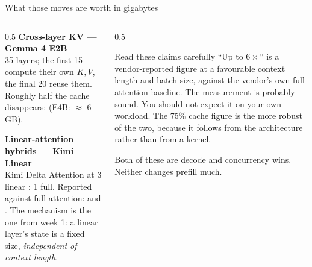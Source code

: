 \documentclass[aspectratio=169,10pt]{beamer}
\begin{document}
\begin{frame}{What those moves are worth in gigabytes}
  \begin{columns}[T]
    \begin{column}{0.5\textwidth}
      \textbf{Cross-layer KV --- Gemma 4 E2B}\\[0.3em]
      \small
      35 layers; the first 15 compute their own $K,V$, the final 20 reuse
      them. Roughly half the cache disappears:
       (E4B: $\approx$
      6\,GB).
      \vspace{0.8em}

      \textbf{Linear-attention hybrids --- Kimi Linear}\\[0.3em]
      \small
      Kimi Delta Attention at 3 linear : 1 full. Reported against full
      attention:  and .
      \vspace{0.4em}
      The mechanism is the one from week 1: a linear layer's state is a fixed
      size, \emph{independent of context length}.
    \end{column}
    \begin{column}{0.5\textwidth}
      \begin{block}{Read these claims carefully}
        \small
        ``Up to $6\times$'' is a vendor-reported figure at a favourable context
        length and batch size, against the vendor's own full-attention
        baseline. The measurement is probably sound. You should not expect it
        on your own workload.
        \vspace{0.4em}
        The 75\% cache figure is the more robust of the two, because it follows
        from the architecture rather than from a kernel.
      \end{block}
      \vspace{0.3em}
      \small
      Both of these are decode and concurrency wins. Neither changes prefill
      much.
    \end{column}
  \end{columns}
\end{frame}
\fi
\end{document}
